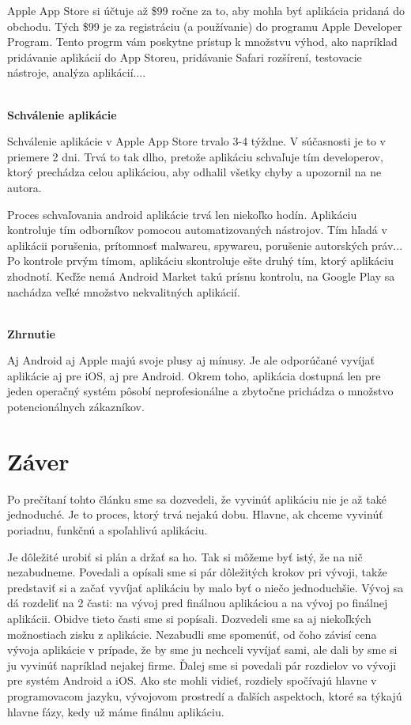 \documentclass[10pt,twoside,slovak,a4paper]{article}
\begin{document}
Apple App Store si účtuje až \$99 ročne za to, aby mohla byť aplikácia pridaná do obchodu. Tých \$99 je za registráciu (a používanie) do programu Apple Developer Program. Tento progrm vám poskytne prístup k množstvu výhod, ako napríklad pridávanie aplikácií do App Storeu, pridávanie Safari rozšírení, testovacie nástroje, analýza aplikácií....
\cite{CWC}

\cite{RedBytes, eYewated3, eliteml}
\\	%


\textbf{Schválenie aplikácie}

Schválenie aplikácie v Apple App Store trvalo 3-4 týždne. V súčasnosti je to v priemere 2 dni. Trvá to tak dlho, pretože aplikáciu schvaľuje tím developerov, ktorý prechádza celou aplikáciou, aby odhalil všetky chyby a upozornil na ne autora.

Proces schvaľovania android aplikácie trvá len niekoľko hodín. Aplikáciu kontroluje tím odborníkov pomocou automatizovaných nástrojov. Tím hľadá v aplikácii porušenia, prítomnosť malwareu, spywareu, porušenie autorských práv... Po kontrole prvým tímom, aplikáciu skontroluje ešte druhý tím, ktorý aplikáciu zhodnotí. Keďže nemá Android Market takú prísnu kontrolu, na Google Play sa nachádza veľké množstvo nekvalitných aplikácií.

\cite{eYew3, DZone}
\\	%


\textbf{Zhrnutie}

Aj Android aj Apple majú svoje plusy aj mínusy. Je ale odporúčané vyvíjať aplikácie aj pre iOS, aj pre Android. Okrem toho, aplikácia dostupná len pre jeden operačný systém pôsobí neprofesionálne a zbytočne prichádza o množstvo potencionálnych zákazníkov.



\section{Záver} \label{zaver} %
\quad Po prečítaní tohto článku sme sa dozvedeli, že vyvinúť aplikáciu nie je až také jednoduché. Je to proces, ktorý trvá nejakú dobu. Hlavne, ak chceme vyvinúť poriadnu, funkčnú a spoľahlivú aplikáciu.

Je dôležité urobiť si plán a držať sa ho. Tak si môžeme byť istý, že na nič nezabudneme. Povedali a opísali sme si pár dôležitých krokov pri vývoji, takže predstaviť si a začať vyvíjať aplikáciu by malo byť o niečo jednoduchšie. Vývoj sa dá rozdeliť na 2 časti: na vývoj pred finálnou aplikáciou a na vývoj po finálnej aplikácii. Obidve tieto časti sme si popísali. Dozvedeli sme sa aj niekoľkých možnostiach zisku z aplikácie. Nezabudli sme spomenúť, od čoho závisí cena vývoja aplikácie v prípade, že by sme ju nechceli vyvíjať sami, ale dali by sme si ju vyvinúť napríklad nejakej firme. Ďalej sme si povedali pár rozdielov vo vývoji pre systém Android a iOS. Ako ste mohli vidieť, rozdiely spočívajú hlavne  v programovacom jazyku, vývojovom prostredí a ďalších aspektoch, ktoré sa týkajú hlavne fázy, kedy už máme finálnu aplikáciu.
\end{document}
